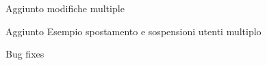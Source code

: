 \begin{changelog}[author=JOHN DOE, sectioncmd=\section*]
	\begin{version}[v=1.0.0,
		date=2023-07-15]
		\added
		\item Aggiunto modifiche multiple
		\item Aggiunto Esempio spostamento e sospensioni utenti multiplo
		\fixed
		\item Bug fixes
	\end{version}
	\end{changelog}
	\listoftodos